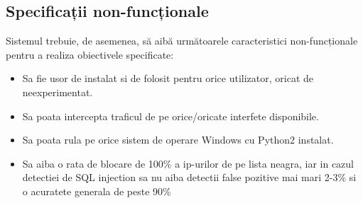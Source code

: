  \subsection{Specificații non-funcționale}

Sistemul trebuie, de asemenea, să aibă următoarele caracteristici non-funcționale pentru a realiza obiectivele specificate:
\begin{itemize}
  \item Sa fie usor de instalat si de folosit pentru orice utilizator, oricat de neexperimentat.
  \item Sa poata intercepta traficul de pe orice/oricate interfete disponibile.
  \item Sa poata rula pe orice sistem de operare Windows cu Python2 instalat.
  \item Sa aiba o rata de blocare de 100\% a ip-urilor de pe lista neagra, iar
  in cazul detectiei de SQL injection sa nu aiba detectii false pozitive mai mari 2-3\%
  si o acuratete generala de peste 90\%
\end{itemize}



